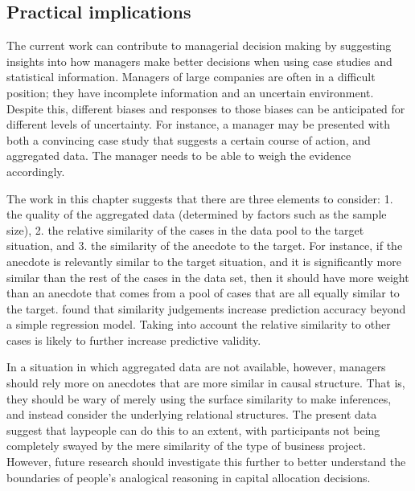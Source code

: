\documentclass[a4paper, nobind, dvipsnames]{templates/ociamthesis}
\theoremstyle{definition}
\theoremstyle{definition}
\theoremstyle{definition}
\theoremstyle{definition}
\theoremstyle{remark}
\begin{document}
\subsection{Practical implications}

The current work can contribute to managerial decision making by suggesting
insights into how managers make better decisions when using case studies and
statistical information. Managers of large companies are often in a difficult
position; they have incomplete information and an uncertain environment. Despite
this, different biases and responses to those biases can be anticipated for
different levels of uncertainty. For instance, a manager may be presented with
both a convincing case study that suggests a certain course of action, and
aggregated data. The manager needs to be able to weigh the evidence accordingly.

The work in this chapter suggests that there are three elements to consider: 1.
the quality of the aggregated data (determined by factors such as the sample
size), 2. the relative similarity of the cases in the data pool to the target
situation, and 3. the similarity of the anecdote to the target. For instance, if
the anecdote is relevantly similar to the target situation, and it is
significantly more similar than the rest of the cases in the data set, then it
should have more weight than an anecdote that comes from a pool of cases that
are all equally similar to the target. \textcite{lovallo2012} found that similarity
judgements increase prediction accuracy beyond a simple regression model. Taking
into account the relative similarity to other cases is likely to further
increase predictive validity.

In a situation in which aggregated data are not available, however, managers
should rely more on anecdotes that are more similar in causal structure. That
is, they should be wary of merely using the surface similarity to make
inferences, and instead consider the underlying relational structures. The
present data suggest that laypeople can do this to an extent, with participants
not being completely swayed by the mere similarity of the type of business
project. However, future research should investigate this further to better
understand the boundaries of people's analogical reasoning in capital allocation
decisions.

\newpage

\printbibliography[segment=\therefsegment,heading=subbibintoc]
\end{document}
